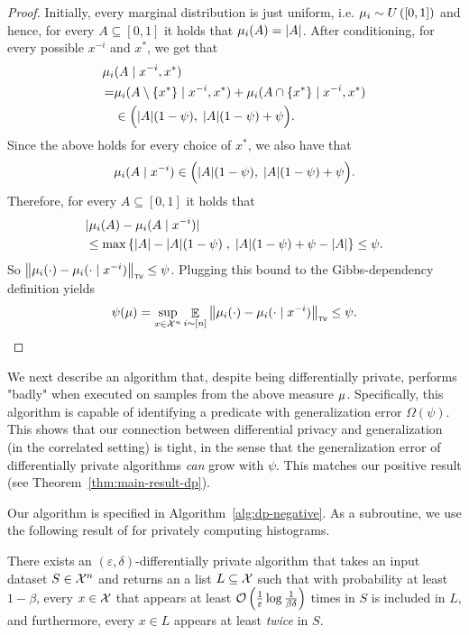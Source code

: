 \documentclass[12pt,a4paper,oneside,onecolumn]{book}
\def\hspace#1{}%
\begin{document}
\begin{proof}
  Initially, every marginal distribution is just uniform, i.e.
  $\mu_i \sim U\left([0,1]\right)$ and hence,
  for every $A\subseteq [0,1]$ it holds that
  $\mu_i(A) = |A|$.
  After conditioning, for every possible $x^{-i}$ and $x^*$, 
  we get that
  \begin{align*}
    \mu_i&(A\mid x^{-i},x^*) \\
    =& \mu_i(A\setminus\{x^*\}\mid x^{-i},x^*) + \mu_i(A\cap\{x^*\}\mid x^{-i},x^*) \\
    &\in \Big( |A|(1-\psi),\; |A|(1-\psi)+\psi\Big).      
  \end{align*}
  Since the above holds for every choice of $x^*$, we also have that
    \[
    \mu_i(A\mid x^{-i})
    \in \Big( |A|(1-\psi),\; |A|(1-\psi)+\psi\Big).
  \]
  Therefore, for every $A\subseteq [0,1]$ it holds that
  \begin{align*}
    &\lvert\mu_i(A) - \mu_i(A\mid x^{-i})\rvert \\
    &\leq 
    \max\left\{ |A|-|A|(1-\psi) \;,\;  
    |A|(1-\psi)+\psi - |A|
    \right\} \leq \psi.      
  \end{align*}
  So
  $\left\lVert\mu_i(\cdot) - \mu_i(\cdot\mid x^{-i})\right\rVert_{\textup{\tiny\textsf{TV}}} \leq \psi$.
  Plugging this bound to the Gibbs-dependency definition yields
  \begin{align*}
    \psi (\mu)
    =
    \sup_{x\in\mathcal{X}^n}
    \mathop{\mathbb{E}}_{i\sim[n]}
    \left\lVert\mu_i(\cdot) - \mu_i(\cdot\mid x^{-i})\right\rVert_{\textup{\tiny\textsf{TV}}}
    \leq
    \psi.
  \end{align*}
\end{proof}

We next describe an algorithm that, despite being differentially private, performs "badly" when executed on samples from the above measure $\mu$. Specifically, this algorithm is capable of identifying a predicate with generalization error $\Omega(\psi)$. This shows that our connection between differential privacy and generalization (in the correlated setting) is tight, in the sense that the generalization error of differentially private algorithms {\em can} grow with $\psi$. This matches our positive result (see Theorem~\ref{thm:main-result-dp}).

Our algorithm is specified in Algorithm~\ref{alg:dp-negative}. As a subroutine, we use the following result of \citet{DBLP:journals/jmlr/BunNS19} for privately computing histograms.
\begin{theorem}\label{thm:hist}
There exists an $(\varepsilon,\delta)$-\hspace{0pt}differentially private algorithm that takes an input dataset $S\in\mathcal{X}^n$ and returns an a list $L\subseteq\mathcal{X}$ such that with probability at least $1-\beta$, every $x\in\mathcal{X}$ that appears at least $\mathcal{O}\left(\frac{1}{\varepsilon}\log\frac{1}{\beta\delta}\right)$ times in $S$ is included in $L$, and furthermore, every $x\in L$ appears at least {\em twice} in $S$.
\end{theorem}
\end{document}
